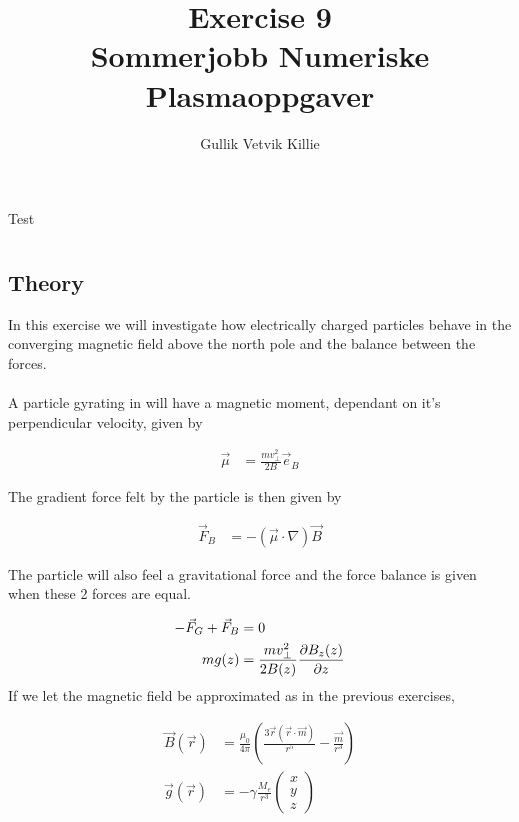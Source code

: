 \documentclass[x11names]{article}
\title{ Exercise 9 \\ Sommerjobb Numeriske Plasmaoppgaver }
\author{Gullik Vetvik Killie
		}
\renewcommand{\va}{\vec}
\begin{document}
\maketitle
Test

\section{}

\subsection{Theory}
  In this exercise we will investigate how electrically charged particles behave in the converging magnetic field above the north pole and the balance between the forces.
\\ \\
  A particle gyrating in will have a magnetic moment, dependant on it's perpendicular velocity, given by

  \begin{align}
    \va{\mu} &= \frac{mv_\perp^2}{2B} \va{e}_B
  \end{align}

  The gradient force felt by the particle is then given by

  \begin{align}
    \va{F}_B &= -\left( \va{\mu}\cdot\nabla \right)\va{B}
  \end{align}

  The particle will also feel a gravitational force and the force balance is given when these 2 forces are equal.

  \begin{align}
    -\va{F}_G + \va{F}_B &= 0  
    \\
    mg(z) &= \frac{mv_\perp^2}{2B(z)} \pdv{B_z(z)}{z}
  \end{align}
  \noindent If we let the magnetic field be approximated as in the previous exercises,

  \begin{align}
    \va{B}(\va{r}) &= \frac{\mu_0}{4\pi}\left( \frac{3\va{r}(\va{r}\cdot\va{m}  )}{r^5} - \frac{\va{m}}{r^3} \right)
    \\
    \va{g}(\va{r}) &= - \gamma \frac{M_e}{r^3}
      \begin{pmatrix}
        x \\ y \\ z
      \end{pmatrix}
  \end{align}
\end{document}
